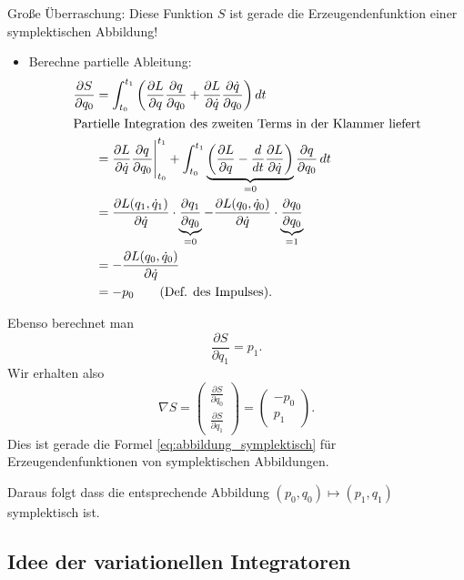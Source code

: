 Große Überraschung: Diese Funktion $S$ ist gerade die Erzeugendenfunktion einer symplektischen Abbildung!
\begin{itemize}
 \item Berechne partielle Ableitung:
  \begin{align*}
   \frac{\partial S}{\partial q_0}
   & =
   \int_{t_0}^{t_1} \bigg( \frac{\partial L}{\partial q} \frac{\partial q}{\partial q_0} + \frac{\partial L}{\partial \dot q}\frac{\partial\dot q}{\partial q_0}\bigg)\,dt \\
   \intertext{Partielle Integration des zweiten Terms in der Klammer liefert}
   &=
   \frac{\partial L}{\partial \dot q}\frac{\partial q}{\partial q_0}\Bigg\vert_{t_0}^{t_1} + \int_{t_0}^{t_1} \underbrace{\bigg( \frac{\partial L}{\partial q}  - \frac{d}{dt} \frac{\partial L}{\partial \dot q}\bigg)}_{=0} \frac{\partial q}{\partial q_0}\,dt \\
		&= \frac{\partial L(q_1,\dot q_1)}{\partial \dot q} \cdot \underbrace{\frac{\partial q_1}{\partial q_0}}_{=0}  - \frac{\partial L(q_0,\dot q_0)}{\partial \dot q} \cdot \underbrace{\frac{\partial q_0}{\partial q_0}}_{=1}  \\
		&= - \frac{\partial L(q_0,\dot q_0)}{\partial \dot q} \\
		&= -p_0 \qquad\text{(Def. des Impulses)}.
	\end{align*}
\end{itemize}
Ebenso berechnet man
\begin{equation*}
	\frac{\partial S}{\partial q_1} = p_1.
\end{equation*}
Wir erhalten also
\begin{equation}
\nabla S =
\begin{pmatrix}
\frac{\partial S}{\partial q_0}  \\
\frac{\partial S}{\partial q_1}
\end{pmatrix}
=
\begin{pmatrix}
-p_0 \\ p_1
\end{pmatrix}.
\end{equation}
Dies ist gerade die Formel \eqref{eq:abbildung_symplektisch} für Erzeugendenfunktionen von symplektischen Abbildungen.

Daraus folgt dass die entsprechende Abbildung $(p_0,q_0) \mapsto (p_1,q_1)$ symplektisch ist.

\subsection{Idee der variationellen Integratoren}

